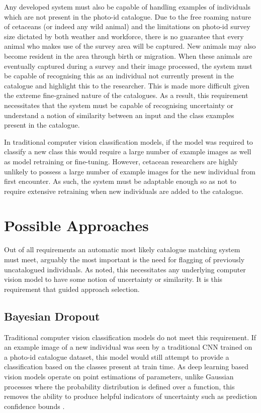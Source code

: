 Any developed system must also be capable of handling examples of individuals which are not present in the photo-id catalogue. Due to the free roaming nature of cetaceans (or indeed any wild animal) and the limitations on photo-id survey size dictated by both weather and workforce, there is no guarantee that every animal who makes use of the survey area will be captured. New animals may also become resident in the area through birth or migration. When these animals are eventually captured during a survey and their image processed, the system must be capable of recognising this as an individual not currently present in the catalogue and highlight this to the researcher. This is made more difficult given the extreme fine-grained nature of the catalogues. As a result, this requirement necessitates that the system must be capable of recognising uncertainty or understand a notion of similarity between an input and the class examples present in the catalogue. 

In traditional computer vision classification models, if the model was required to classify a new class this would require a large number of example images as well as model retraining or fine-tuning. However, cetacean researchers are highly unlikely to possess a large number of example images for the new individual from first encounter. As such, the system must be adaptable enough so as not to require extensive retraining when new individuals are added to the catalogue.

\section{Possible Approaches}\label{ch:ID,sec:deciding}

Out of all requirements an automatic most likely catalogue matching system must meet, arguably the most important is the need for flagging of previously uncatalogued individuals. As noted, this necessitates any underlying computer vision model to have some notion of uncertainty or similarity. It is this requirement that guided approach selection. 

\subsection{Bayesian Dropout}\label{ch:ID,sec:deciding,sub:bayesianDropout}

Traditional computer vision classification models do not meet this requirement. If an example image of a new individual was seen by a traditional CNN trained on a photo-id catalogue dataset, this model would still attempt to provide a classification based on the classes present at train time.  As deep learning based vision models operate on point estimations of parameters, unlike Gaussian processes where the probability distribution is defined over a function, this removes the ability to produce helpful indicators of uncertainty such as prediction confidence bounds \cite{gal_uncertainty_2016}. 

